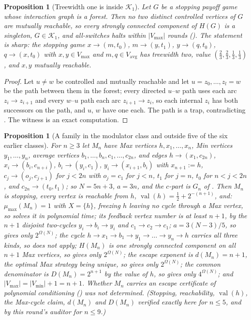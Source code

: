 \documentclass[11pt]{article}
\theoremstyle{plain}
\newtheorem{proposition}[theorem]{Proposition}
\theoremstyle{definition}
\DeclareMathOperator{\val}{val}
\newcommand{\Vmax}{V_{\max}}
\newcommand{\Vmin}{V_{\min}}
\newcommand{\Vavg}{V_{\mathrm{avg}}}
\begin{document}
\begin{proposition}[Treewidth one is inside $\mathcal K_1$]\label{prop:forest-k1}
Let $G$ be a stopping payoff game whose interaction graph is a forest.
Then no two distinct controlled vertices of $G$ are mutually reachable,
so every strongly connected component of $H(G)$ is a singleton,
$G\in\mathcal K_1$, and all-switches halts within $|\Vmax|$ rounds
(). The statement is sharp: the stopping
game $x\to(m,t_0)$, $m\to(y,t_1)$, $y\to(q,t_0)$, $q\to(x,t_0)$ with
$x,y\in\Vmax$ and $m,q\in\Vavg$ has treewidth two, value
$(\tfrac23,\tfrac23,\tfrac13,\tfrac13)$, and $x,y$ mutually reachable.
\end{proposition}

\begin{proof}
Let $u\ne w$ be controlled and mutually reachable and let
$u=z_0,\dots,z_l=w$ be the path between them in the forest; every
directed $u$--$w$ path uses each arc $z_i\to z_{i+1}$ and every $w$--$u$
path each arc $z_{i+1}\to z_i$, so each internal $z_i$ has both
successors on the path, and $u$, $w$ have one each. The path is a trap,
contradicting . The witness is an exact computation.
\end{proof}

\begin{proposition}[A family in the modulator class and outside five of the six earlier classes]\label{prop:modulator-family}
For $n\ge3$ let $M_n$ have Max vertices $h,x_1,\dots,x_n$, Min vertices
$y_1,\dots,y_n$, average vertices $b_1,\dots,b_n,c_1,\dots,c_{2n}$, and
edges $h\to(x_1,c_{2n})$, $x_i\to(b_i,c_{n+i})$, $b_i\to(y_i,c_1)$,
$y_i\to(x_{i+1},b_i)$ with $x_{n+1}:=h$, $c_j\to(o_j,c_{j+1})$ for
$j<2n$ with $o_j=c_1$ for $j<n$, $t_1$ for $j=n$, $t_0$ for $n<j<2n$, and
$c_{2n}\to(t_0,t_1)$; so $N=5n+3$, $a=3n$, and the $c$-part is $G_n$ of
. Then $M_n$ is stopping, every vertex is reachable
from $h$, $\val(h)=\tfrac12+2^{-(n+1)}$, and: $\mu_{\max}(M_n)=1$ with
$X=\{h\}$, freezing $h$ leaving no cycle through a Max vertex, so
 solves it in polynomial time; its feedback vertex
number is at least $n+1$, by the $n+1$ disjoint two-cycles
$y_i\to b_i\to y_i$ and $c_1\to c_2\to c_1$; $a=3(N-3)/5$, so
 gives only $2^{\Omega(N)}$; the cycle
$h\to x_1\to b_1\to y_1\to\dots\to y_n\to h$ carries all three kinds, so
 does not apply; $H(M_n)$ is one strongly connected
component on all $n+1$ Max vertices, so 
gives only $2^{\Omega(N)}$; the escape exponent is $d(M_n)=n+1$, the
optimal Max strategy being unique, so  gives only
$2^{\Omega(N)}$; the common denominator is $D(M_n)=2^{n+1}$ by the value
of $h$, so  gives only $4^{\Omega(N)}$; and
$|\Vmax|=|\Vmin|+1=n+1$. Whether $M_n$ carries an escape certificate of
polynomial conditioning () was not determined.
(Stopping, reachability, $\val(h)$, the Max-cycle claim, $d(M_n)$ and
$D(M_n)$ verified exactly here for $n\le5$, and by this round's auditor
for $n\le9$.)
\end{proposition}
\end{document}
